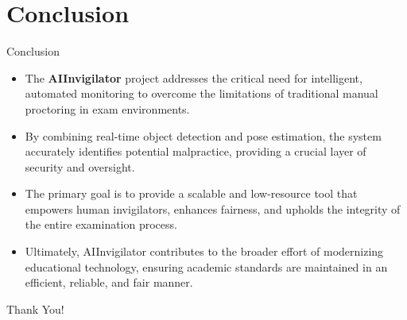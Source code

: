 \documentclass{beamer}
\begin{document}
\section{Conclusion}
\begin{frame}{Conclusion}
\begin{itemize}
    \item The \textbf{AIInvigilator} project addresses the critical need for intelligent, automated monitoring to overcome the limitations of traditional manual proctoring in exam environments.
    \item By combining real-time object detection and pose estimation, the system accurately identifies potential malpractice, providing a crucial layer of security and oversight.
    \item The primary goal is to provide a scalable and low-resource tool that empowers human invigilators, enhances fairness, and upholds the integrity of the entire examination process.
    \item Ultimately, AIInvigilator contributes to the broader effort of modernizing educational technology, ensuring academic standards are maintained in an efficient, reliable, and fair manner.
\end{itemize}
\end{frame}

\begin{frame}{}
    \centering
    \Huge Thank You!
\end{frame}
\end{document}

